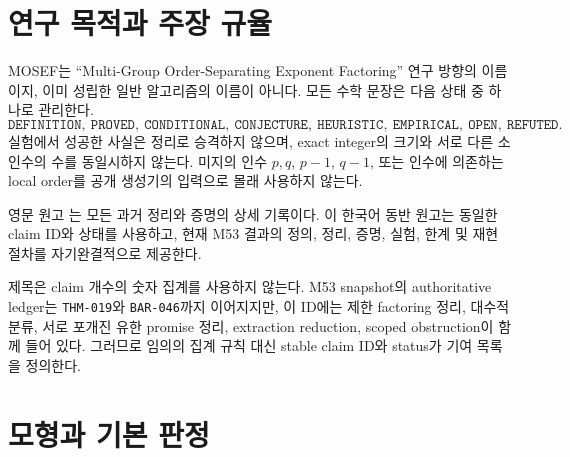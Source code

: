 \documentclass[11pt]{article}
\begin{document}
\begin{abstract}
private-pair 실패 두 개는 \(K_3/K_4\) coverer incidence를 가지며,
하나의 정확한 \(t-1\) repair 정리와 verifier 작업 감소 없는 56-bit
payload 압축을 준다. 19개 repair 전체의 정확한 coverer slot은
loop-only 12개, looped-clique 5개, loopless-clique 2개이고 통합 구조
payload는 1,228 bit가 아니라 1,063 bit이다. equality witness는 여덟
non-template perturbation 중 다섯 개를 인증한다. 이어
augmenting-path/alternating-reachability constructor가 여섯 bipartite
target을 풀며, triangle-plus-pendant equality와 \(C_5\) gap은
bipartiteness가 충분조건이지 필요조건은 아님을 보인다. 공급된
odd-cycle transversal \(X\)가 있으면 \(2^{|X|}\) branch reduction이
일곱 추가 target의 exact cover를 구성하고 잘못된 \(K_5\) transversal
하나를 거부한다. 이는 fixed-parameter 결과이지 unrestricted polynomial
algorithm이 아니다.
이 양성 결과는 인수분해에 의존하는 유한 약속 정리이다. 일반 고전적
다항 시간 정수분해 알고리즘이나 모든 다항 selector의 하한은 주장하지
않는다.
\end{abstract}

\section{연구 목적과 주장 규율}

MOSEF는 ``Multi-Group Order-Separating Exponent Factoring'' 연구
방향의 이름이지, 이미 성립한 일반 알고리즘의 이름이 아니다. 모든
수학 문장은 다음 상태 중 하나로 관리한다.
\[
\texttt{DEFINITION},\ \texttt{PROVED},\ \texttt{CONDITIONAL},\
\texttt{CONJECTURE},\ \texttt{HEURISTIC},\ \texttt{EMPIRICAL},\
\texttt{OPEN},\ \texttt{REFUTED}.
\]
실험에서 성공한 사실은 정리로 승격하지 않으며, exact integer의
크기와 서로 다른 소인수의 수를 동일시하지 않는다. 미지의 인수
\(p,q\), \(p-1\), \(q-1\), 또는 인수에 의존하는 local order를
공개 생성기의 입력으로 몰래 사용하지 않는다.

영문 원고 는 모든 과거 정리와 증명의 상세
기록이다. 이 한국어 동반 원고는 동일한 claim ID와 상태를 사용하고,
현재 M53 결과의 정의, 정리, 증명, 실험, 한계 및 재현 절차를
자기완결적으로 제공한다.

제목은 claim 개수의 숫자 집계를 사용하지 않는다. M53 snapshot의
authoritative ledger는 \texttt{THM-019}와 \texttt{BAR-046}까지
이어지지만, 이 ID에는 제한 factoring 정리, 대수적 분류, 서로 포개진
유한 promise 정리, extraction reduction, scoped obstruction이 함께
들어 있다. 그러므로 임의의 집계 규칙 대신 stable claim ID와 status가
기여 목록을 정의한다.

\section{모형과 기본 판정}
\end{document}
